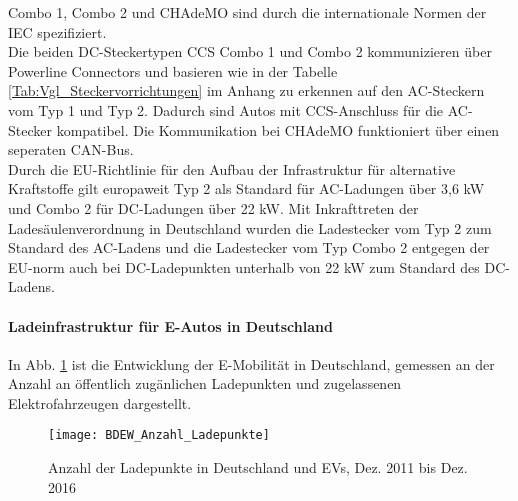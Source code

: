 				Combo 1, Combo 2 und CHAdeMO sind durch die internationale Normen der IEC spezifiziert. \\
				
				Die beiden DC-Steckertypen \ac{CCS} Combo 1 und Combo 2 kommunizieren über Powerline Connectors und basieren wie in der Tabelle \ref{Tab:Vgl_Steckervorrichtungen} im Anhang zu erkennen auf den AC-Steckern vom Typ 1 und Typ 2. Dadurch sind Autos mit CCS-Anschluss für die AC-Stecker kompatibel. Die Kommunikation bei CHAdeMO funktioniert über einen seperaten CAN-Bus. \cite{Emobility_StatusQuo_2016} \\ 
				
				Durch die EU-Richtlinie für den Aufbau der Infrastruktur für alternative Kraftstoffe gilt europaweit Typ 2 als Standard für AC-Ladungen über 3,6 kW und Combo 2 für DC-Ladungen über 22 kW. \cite{EU_Aufbau_Infrastruktur} Mit Inkrafttreten der Ladesäulenverordnung in Deutschland wurden die Ladestecker vom Typ 2 zum Standard des AC-Ladens und die Ladestecker vom Typ Combo 2 entgegen der EU-norm auch bei DC-Ladepunkten unterhalb von 22 kW zum Standard des DC-Ladens. \cite{BMJV_LSV} \\


				
%			
			
			
			\paragraph{Ladeinfrastruktur für E-Autos in Deutschland}
				In Abb. \ref{Abb:BDEW_Anzahl_Ladepunkte} ist die Entwicklung der E-Mobilität in Deutschland, gemessen an der Anzahl an öffentlich zugänlichen Ladepunkten und zugelassenen Elektrofahrzeugen dargestellt.\\
					
				\begin{figure}[h]
					\centering
					\texttt{[image: BDEW\_Anzahl\_Ladepunkte]}
					\caption{Anzahl der Ladepunkte in Deutschland und EVs, Dez. 2011 bis Dez. 2016 \cite{BDEW_Anzahl_Ladepunkte}}
					\label{Abb:BDEW_Anzahl_Ladepunkte}
				\end{figure}	
			
